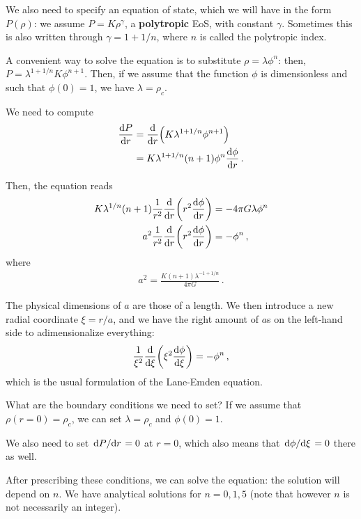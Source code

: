 \documentclass[main.tex]{subfiles}
\begin{document}
We also need to specify an equation of state, which we will have in the form \(P(\rho )\): we assume \(P = K \rho^{\gamma }\), a \textbf{polytropic} EoS, with constant \(\gamma \).
Sometimes this is also written through \(\gamma = 1 + 1/n\), where \(n\) is called the polytropic index. 

A convenient way to solve the equation is to substitute \(\rho = \lambda \phi^{n}\): then, \(P = \lambda^{1+1/n} K \phi^{n+1}\). 
Then, if we assume that the function \(\phi \) is dimensionless and such that \(\phi (0) = 1\), we have \(\lambda = \rho _c\). 

We need to compute 
%
\begin{align}
\dv{P}{r} &= \dv{}{r} \qty( K \lambda^{1 + 1/n} \phi^{n+1})  \\
&= K \lambda^{1 + 1/n} (n+1) \phi^{n} \dv{\phi }{r} 
\,.
\end{align}

Then, the equation reads 
%
\begin{align}
K \lambda^{1/n} (n+1) \frac{1}{r^2} \dv{}{r} \qty(r^2 \dv{\phi }{r} )
&= - 4 \pi G \lambda \phi^{n}  \\
a^2 \frac{1}{r^2} \dv{}{r} \qty(r^2 \dv{\phi }{r}) &= - \phi^{n} 
\,,
\end{align}
%
where 
%
\begin{align}
a^2 = \frac{K (n+1) \lambda^{-1 + 1/n}}{4 \pi G}
\,.
\end{align}

The physical dimensions of \(a\) are those of a length. 
We then introduce a new radial coordinate \(\xi = r /a\), and we have the right amount of \(a\)s on the left-hand side to adimensionalize everything: 
%
\begin{align}
\frac{1}{\xi^2} \dv{}{\xi } \qty(\xi^2 \dv{\phi }{\xi }) = - \phi^{n}
\,,
\end{align}
%
which is the usual formulation of the Lane-Emden equation. 

What are the boundary conditions we need to set? If we assume that \(\rho (r=0) = \rho _c\), we can set \(\lambda = \rho _c\) and \(\phi (0) = 1\).

We also need to set \(\dv*{P}{r} = 0\) at \(r = 0\), which also means that \(\dv*{\phi }{\xi } =0 \) there as well. 


After prescribing these conditions, we can solve the equation: the solution will depend on \(n\). 
We have analytical solutions for \(n = 0, 1, 5\) (note that however \(n\) is not necessarily an integer). 
\end{document}
